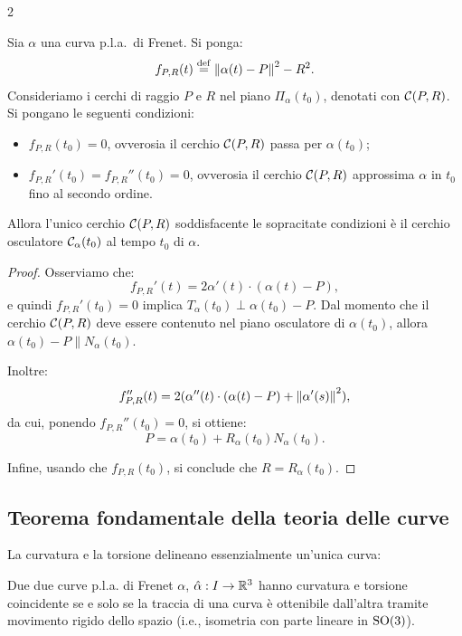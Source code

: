 \begin{multicols*}{2}
    \begin{proposition}
        Sia $\alpha$ una curva p.l.a.~di Frenet. Si ponga:
        \[
            f_{P, R}(t) \overset{\mathrm{def}}{=} \left\lVert \alpha(t) - P \right\rVert^2 - R^2.
        \]
        Consideriamo i cerchi di raggio $P$ e $R$ nel piano $\Pi_\alpha(t_0)$, denotati con $\mathcal{C}(P, R)$.
        Si pongano le seguenti condizioni:
        \begin{itemize}
            \item $f_{P, R}(t_0) = 0$, ovverosia il cerchio $\mathcal{C}(P, R)$ passa per $\alpha(t_0)$;
            \item $f_{P, R}'(t_0) = f_{P, R}''(t_0) = 0$, ovverosia il
                  cerchio $\mathcal{C}(P, R)$ approssima $\alpha$ in $t_0$ fino al secondo ordine.
        \end{itemize}
        Allora l'unico cerchio $\mathcal{C}(P, R)$
        soddisfacente le sopracitate condizioni
        è il cerchio osculatore $\mathcal{C}_\alpha(t_0)$ al tempo $t_0$ di $\alpha$.
    \end{proposition}

    \begin{proof}
        Osserviamo che:
        \[ f_{P, R}'(t) = 2 \alpha'(t) \cdot (\alpha(t) - P), \]
        e quindi $f_{P, R}'(t_0) = 0$ implica $T_{\alpha}(t_0) \perp \alpha(t_0) - P$.
        Dal momento che il cerchio $\mathcal{C}(P, R)$ deve essere contenuto nel piano osculatore
        di $\alpha(t_0)$, allora $\alpha(t_0) - P \parallel N_\alpha(t_0)$. \medskip

        Inoltre:
        \[ f_{P, R}''(t) = 2 (\alpha''(t) \cdot (\alpha(t) - P) + \left\lVert \alpha'(s) \right\rVert^2), \]
        da cui, ponendo $f_{P, R}''(t_0) = 0$, si ottiene:
        \[ P = \alpha(t_0) + R_\alpha(t_0) N_\alpha(t_0). \]

        Infine, usando che $f_{P, R}(t_0)$, si conclude che $R = R_\alpha(t_0)$.
    \end{proof}

    \subsection{Teorema fondamentale della teoria delle curve}

    La curvatura e la torsione delineano essenzialmente un'unica curva:

    \begin{theorem}
        Due due curve p.l.a.
        di Frenet $\alpha$, $\hat{\alpha} : I \to \mathbb{R}^3$ hanno curvatura e torsione
        coincidente se e solo se la traccia di una curva è ottenibile dall'altra tramite
        movimento rigido dello spazio \textnormal{(i.e., isometria con
            parte lineare in $\operatorname{SO}(3)$)}.
    \end{theorem}
\end{multicols*}
